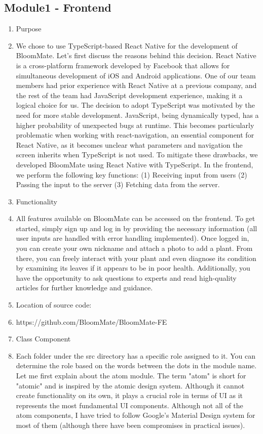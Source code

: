 \documentclass[conference, a4paper]{IEEEtran}
\begin{document}
\subsection{Module1 -  Frontend}
\begin{enumerate}
    \item Purpose
    \item[] We chose to use TypeScript-based React Native for the development of BloomMate. Let's first discuss the reasons behind this decision. React Native is a cross-platform framework developed by Facebook that allows for simultaneous development of iOS and Android applications. One of our team members had prior experience with React Native at a previous company, and the rest of the team had JavaScript development experience, making it a logical choice for us. The decision to adopt TypeScript was motivated by the need for more stable development. JavaScript, being dynamically typed, has a higher probability of unexpected bugs at runtime. This becomes particularly problematic when working with react-navigation, an essential component for React Native, as it becomes unclear what parameters and navigation the screen inherits when TypeScript is not used. To mitigate these drawbacks, we developed BloomMate using React Native with TypeScript. In the frontend, we perform the following key functions: (1) Receiving input from users (2) Passing the input to the server (3) Fetching data from the server.\\
    \item Functionality
    \item[] All features available on BloomMate can be accessed on the frontend. To get started, simply sign up and log in by providing the necessary information (all user inputs are handled with error handling implemented). Once logged in, you can create your own nickname and attach a photo to add a plant. From there, you can freely interact with your plant and even diagnose its condition by examining its leaves if it appears to be in poor health. Additionally, you have the opportunity to ask questions to experts and read high-quality articles for further knowledge and guidance.\\
    \item Location of source code:
    \item[] https://github.com/BloomMate/BloomMate-FE\\
    \item Class Component
    \item[] Each folder under the src directory has a specific role assigned to it. You can determine the role based on the words between the dots in the module name. Let me first explain about the atom module. The term "atom" is short for "atomic" and is inspired by the atomic design system. Although it cannot create functionality on its own, it plays a crucial role in terms of UI as it represents the most fundamental UI components. Although not all of the atom components, I have tried to follow Google's Material Design system for most of them (although there have been compromises in practical issues).

\end{enumerate}
\end{document}

